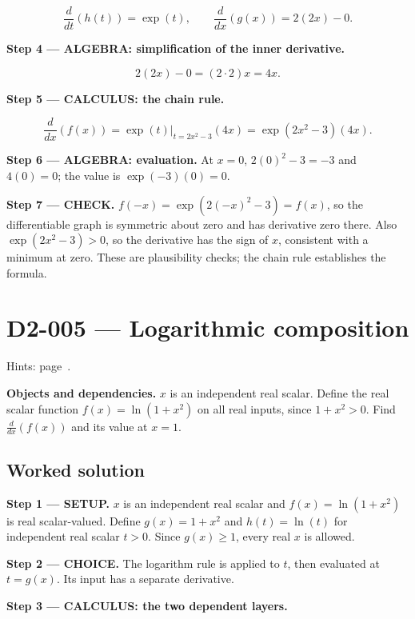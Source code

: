 \documentclass[11pt,oneside,openany]{book}
\begin{document}
\[
\frac{d}{dt}\left(h(t)\right)=\exp(t),\qquad
\frac{d}{dx}\left(g(x)\right)=2(2x)-0.
\]

\begingroup\color{AlgebraBlue}
\textbf{Step 4 --- ALGEBRA: simplification of the inner derivative.}

\[
2(2x)-0=(2\cdot2)x=4x.
\]

\endgroup
\textbf{Step 5 --- CALCULUS: the chain rule.}

\[
\frac{d}{dx}\left(f(x)\right)
=\left.\exp(t)\right|_{t=2x^2-3}(4x)
=\exp(2x^2-3)(4x).
\]

\begingroup\color{AlgebraBlue}
\textbf{Step 6 --- ALGEBRA: evaluation.} At \(x=0\), \(2(0)^2-3=-3\) and \(4(0)=0\);
the value is \(\exp(-3)(0)=0\).

\endgroup
\textbf{Step 7 --- CHECK.} \(f(-x)=\exp(2(-x)^2-3)=f(x)\), so the differentiable graph
is symmetric about zero and has derivative zero there. Also \(\exp(2x^2-3)>0\),
so the derivative has the sign of \(x\), consistent with a minimum at zero.
These are plausibility checks; the chain rule establishes the formula.
\clearpage
\section{D2-005 --- Logarithmic composition}
\label{problem:D2-005}
{\small Hints: page~\pageref{hints:D2-005}.}\par\medskip

\textbf{Objects and dependencies.} \(x\) is an independent real scalar. Define the real
scalar function \(f(x)=\ln(1+x^2)\) on all real inputs, since \(1+x^2>0\).
Find \(\frac{d}{dx}\left(f(x)\right)\) and its value at \(x=1\).
\subsection*{Worked solution}

\textbf{Step 1 --- SETUP.} \(x\) is an independent real scalar and
\(f(x)=\ln(1+x^2)\) is real scalar-valued. Define \(g(x)=1+x^2\) and \(h(t)=\ln(t)\)
for independent real scalar \(t>0\). Since \(g(x)\ge1\), every real \(x\) is allowed.

\begin{ChoiceStep}
\textbf{Step 2 --- CHOICE.} The logarithm rule is applied to \(t\), then evaluated at
\(t=g(x)\). Its input has a separate derivative.

\end{ChoiceStep}
\textbf{Step 3 --- CALCULUS: the two dependent layers.}
\end{document}
